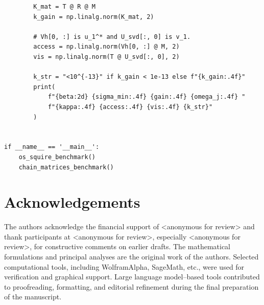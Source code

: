 \documentclass[review]{siamart220329}
\theoremstyle{definition}
\theoremstyle{remark}
\begin{document}
\begin{verbatim}
        K_mat = T @ R @ M
        k_gain = np.linalg.norm(K_mat, 2)

        # Vh[0, :] is u_1^* and U_svd[:, 0] is v_1.
        access = np.linalg.norm(Vh[0, :] @ M, 2)
        vis = np.linalg.norm(T @ U_svd[:, 0], 2)

        k_str = "<10^{-13}" if k_gain < 1e-13 else f"{k_gain:.4f}"
        print(
            f"{beta:2d} {sigma_min:.4f} {gain:.4f} {omega_j:.4f} "
            f"{kappa:.4f} {access:.4f} {vis:.4f} {k_str}"
        )


if __name__ == '__main__':
    os_squire_benchmark()
    chain_matrices_benchmark()
\end{verbatim}


\section*{Acknowledgements}
The authors acknowledge the financial support of \textless anonymous for review\textgreater{} and thank participants at \textless anonymous for review\textgreater{}, especially \textless anonymous for review\textgreater{}, for constructive comments on earlier drafts. The mathematical formulations and principal analyses are the original work of the authors. Selected computational tools, including WolframAlpha, SageMath, etc., were used for verification and graphical support. Large language model--based tools contributed to proofreading, formatting, and editorial refinement during the final preparation of the manuscript.
\end{document}
